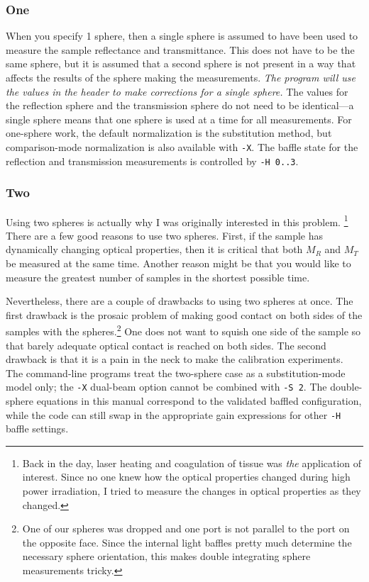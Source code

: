 \documentclass{article}
\begin{document}
\subsubsection{One}

When you specify 1 sphere, then a single sphere is assumed to have been used to 
measure the sample reflectance and transmittance.  This does not have to be the
same sphere, but it is assumed that a second sphere is not present in a way that
affects the results of the sphere making the measurements.
\textit{The program will use the values in the header to make corrections
for a single sphere.}  The values for the reflection sphere and the transmission
sphere do not need to be identical---a single sphere means that one sphere is
used at a time for all measurements.  For one-sphere work, the default
normalization is the substitution method, but comparison-mode normalization is
also available with \texttt{-X}.  The baffle state for the reflection and
transmission measurements is controlled by \texttt{-H 0..3}.

\subsubsection{Two}

Using two spheres is actually why I was originally interested in this problem.%
\footnote{Back in the day, laser heating and coagulation of tissue was
\textit{the} application of interest.  Since no one knew how the optical properties
changed during high power irradiation, I tried to measure the changes in optical
properties as they changed.}
There are a few good reasons to use two spheres.  First, if the
sample has dynamically changing optical properties, then it is critical
that both $M_R$ and $M_T$ be measured at the same time.  Another reason
might be that you would like to measure the greatest number of samples in
the shortest possible time.  

Nevertheless, there are a couple of drawbacks to using two spheres at once.
The first drawback is the prosaic problem of making good contact on both sides of
the samples with the spheres.\footnote{One of our spheres was dropped and
one port is not parallel to the port on the opposite face.  Since the internal
light baffles pretty much determine the necessary sphere orientation, this makes
double integrating sphere measurements tricky.}
One does not want to squish one side of the sample so that barely adequate
optical contact is reached on both sides.  The second drawback is that it is
a pain in the neck to make the calibration experiments.  The command-line
programs treat the two-sphere case as a substitution-mode model only; the
\texttt{-X} dual-beam option cannot be combined with \texttt{-S 2}.  The
double-sphere equations in this manual correspond to the validated baffled
configuration, while the code can still swap in the appropriate gain expressions
for other \texttt{-H} baffle settings.
\end{document}
